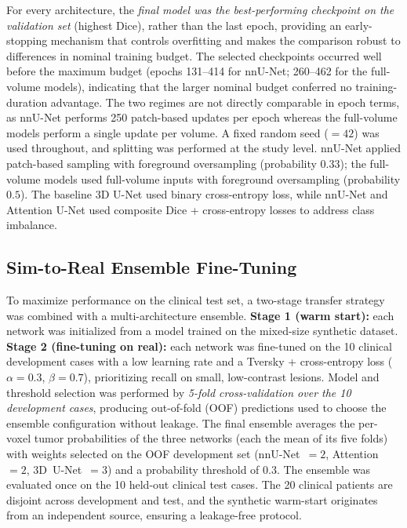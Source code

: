 \documentclass[11pt]{article}
\begin{document}
For every architecture, the \emph{final model was the best-performing checkpoint on
the validation set} (highest Dice), rather than the last epoch, providing an
early-stopping mechanism that controls overfitting and makes the comparison robust
to differences in nominal training budget. The selected checkpoints occurred well
before the maximum budget (epochs 131--414 for nnU-Net; 260--462 for the
full-volume models), indicating that the larger nominal budget conferred no
training-duration advantage. The two regimes are not directly comparable in epoch
terms, as nnU-Net performs 250 patch-based updates per epoch whereas the full-volume
models perform a single update per volume. A fixed random seed ($=42$) was used
throughout, and splitting was performed at the study level. nnU-Net applied
patch-based sampling with foreground oversampling (probability $0.33$); the
full-volume models used full-volume inputs with foreground oversampling
(probability $0.5$). The baseline 3D U-Net used binary cross-entropy loss, while
nnU-Net and Attention U-Net used composite Dice + cross-entropy losses to address
class imbalance.

\subsection{Sim-to-Real Ensemble Fine-Tuning}
\label{sec:ensemble}
To maximize performance on the clinical test set, a two-stage transfer strategy was
combined with a multi-architecture ensemble. \textbf{Stage 1 (warm start):} each
network was initialized from a model trained on the mixed-size synthetic dataset.
\textbf{Stage 2 (fine-tuning on real):} each network was fine-tuned on the 10
clinical development cases with a low learning rate and a Tversky + cross-entropy
loss ($\alpha=0.3$, $\beta=0.7$), prioritizing recall on small, low-contrast
lesions. Model and threshold selection was performed by \emph{5-fold cross-validation
over the 10 development cases}, producing out-of-fold (OOF) predictions used to
choose the ensemble configuration without leakage. The final ensemble averages the
per-voxel tumor probabilities of the three networks (each the mean of its five
folds) with weights selected on the OOF development set (nnU-Net~$=2$, Attention~$=2$,
3D~U-Net~$=3$) and a probability threshold of $0.3$. The ensemble was evaluated once
on the 10 held-out clinical test cases. The 20 clinical patients are disjoint across
development and test, and the synthetic warm-start originates from an independent
source, ensuring a leakage-free protocol.
\end{document}
